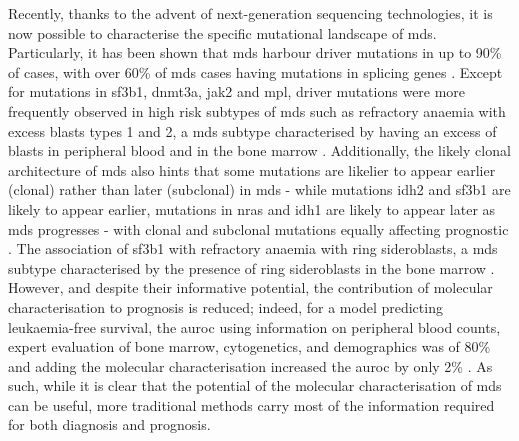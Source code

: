 Recently, thanks to the advent of next-generation sequencing technologies, it is now possible to characterise the specific mutational landscape of \ac{mds}. Particularly, it has been shown that \ac{mds} harbour driver mutations in up to 90\% of cases, with over 60\% of \ac{mds} cases having mutations in splicing genes \cite{Papaemmanuil2013-yt,Haferlach2014-bh}. Except for mutations in \ac{sf3b1}, \ac{dnmt3a}, \ac{jak2} and \ac{mpl}, driver mutations were more frequently observed in high risk subtypes of \ac{mds} such as refractory anaemia with excess blasts types 1 and 2, a \ac{mds} subtype characterised by having an excess of blasts in peripheral blood and in the bone marrow \cite{Haferlach2014-bh}. Additionally, the likely clonal architecture of \ac{mds} also hints that some mutations are likelier to appear earlier (clonal) rather than later (subclonal) in \ac{mds} - while mutations \ac{idh2} and \ac{sf3b1} are likely to appear earlier, mutations in \ac{nras} and \ac{idh1} are likely to appear later as \ac{mds} progresses - with clonal and subclonal mutations equally affecting prognostic \cite{Papaemmanuil2013-yt}. The association of \ac{sf3b1} with refractory anaemia with ring sideroblasts, a \ac{mds} subtype characterised by the presence of ring sideroblasts in the bone marrow \cite{PaPapaemmanuil2011-nr Papaemmanuil2013-yt, Haferlach2014-bh}. However, and despite their informative potential, the contribution of molecular characterisation to prognosis is reduced; indeed, for a model predicting leukaemia-free survival, the \ac{auroc} using information on peripheral blood counts, expert evaluation of bone marrow, cytogenetics, and demographics was of 80\% and adding the molecular characterisation increased the \ac{auroc} by only 2\% \cite{Papaemmanuil2013-yt}. As such, while it is clear that the potential of the molecular characterisation of \ac{mds} can be useful, more traditional methods carry most of the information required for both diagnosis and prognosis.

